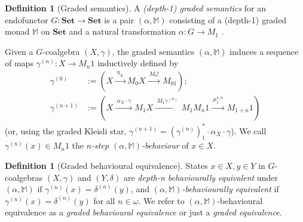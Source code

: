 \documentclass[sigconf,
			final%
			nonacm
                        ]{acmart}
\numberwithin{equation}{section}
\numberwithin{equation}{section}
\theoremstyle{plain}
\theoremstyle{definition}
\newtheorem{defn}[thm]{Definition}
\newcommand{\xra}[1]{\xrightarrow{~#1~}}
\newcommand{\M}{\mathbb{M}}                   %
\newcommand{\Set}{\mathbf{Set}}
\begin{document}
\begin{defn}[Graded semantics]
  A \emph{(depth-1) graded semantics} for an endofunctor
  $G\colon\Set\to\Set$ is a pair $(\alpha, \M)$ consisting of a
  (depth-1) graded monad $\M$ on $\Set$ and a natural transformation
  $\alpha\colon G\to M_1$ .
\end{defn}
\noindent
Given a $G$-coalgebra $(X,\gamma)$, the graded
semantics $(\alpha, \M)$ induces a sequence of
maps $\gamma^{(n)}\colon X\to M_n1$ inductively
defined by
\begin{align*}
  \gamma^{(0)} &:= (X\xra{\eta_X}M_0X\xra{M_0!}M_01); \\
  \gamma^{(n+1)} &:= (X\xra{\alpha_X\cdot\gamma} M_1X
                                  \xra{M_1\gamma^{(n)}} M_1M_n 1
				 \xra{\mu^{1,n}_1} M_{1+n}1)
\end{align*}
(or, using the graded Kleisli star,
$\gamma^{(n+1)} = (\gamma^{(n)})^*_1\cdot\alpha_X\cdot\gamma$). We call
$\gamma^{(n)}(x)\in M_n1$ the \emph{$n$-step $(\alpha, \M)$-behaviour}
of $x\in X$.

\begin{defn}[Graded behavioural equivalence]
  States ${x\in X, y\in Y}$ in $G$-coalgebras $(X, \gamma)$ and
  $(Y, \delta)$ are \emph{depth-n behaviourally equivalent} under
  $(\alpha, \M)$ if ${\gamma^{(n)}(x) = \delta^{(n)}(y)}$, and
  \emph{$(\alpha, \M)$-behaviourally equivalent} if
  $\gamma^{(n)}(x) = \delta^{(n)}(y)$ for all $n\in\omega$. We
  refer to $(\alpha,\M)$-behavioural equivalence as a
  \emph{graded behavioural equivalence} or just a \emph{graded
    equivalence}.
\end{defn}
\end{document}
